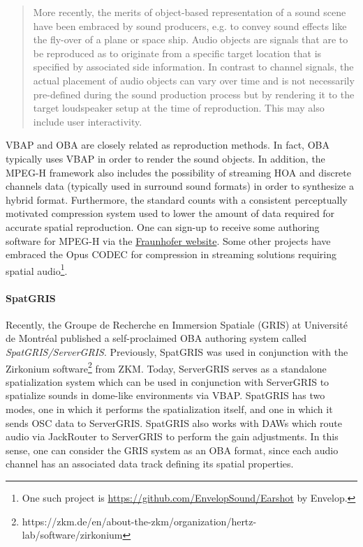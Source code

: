 \begin{quote}
    More recently, the merits of object-based representation of a sound scene have been embraced by sound producers, e.g. to convey sound effects like the fly-over of a plane or space ship. Audio objects are signals that are to be reproduced as to originate from a specific target location that is specified by associated side information. In contrast to channel signals, the actual placement of audio objects can vary over time and is not necessarily pre-defined during the sound production process but by rendering it to the target loudspeaker setup at the time of reproduction. This may also include user interactivity.
\end{quote}

VBAP and OBA are closely related as reproduction methods. In fact, OBA typically uses VBAP in order to render the sound objects. In addition, the MPEG-H framework also includes the possibility of streaming HOA and discrete channels data (typically used in surround sound formats) in order to synthesize a hybrid format. Furthermore, the standard counts with a consistent perceptually motivated compression system used to lower the amount of data required for accurate spatial reproduction. One can sign-up to receive some authoring software for MPEG-H via the  \href{https://www.iis.fraunhofer.de/en/ff/amm/dl/software/mas.html}{Fraunhofer website}. Some other projects have embraced the Opus CODEC for compression in streaming solutions requiring spatial audio\footnote{One such project is \href{Earshot}{https://github.com/EnvelopSound/Earshot} by Envelop.}.

\paragraph{SpatGRIS}

Recently, the Groupe de Recherche en Immersion Spatiale (GRIS) at Université de Montréal published a self-proclaimed OBA authoring system called \textit{SpatGRIS/ServerGRIS}. Previously, SpatGRIS was used in conjunction with the Zirkonium software\footnote{https://zkm.de/en/about-the-zkm/organization/hertz-lab/software/zirkonium} from ZKM. Today, ServerGRIS serves as a standalone spatialization system which can be used in conjunction with ServerGRIS to spatialize sounds in dome-like environments via VBAP. SpatGRIS has two modes, one in which it performs the spatialization itself, and one in which it sends OSC data to ServerGRIS. SpatGRIS also works with DAWs which route audio via JackRouter to ServerGRIS to perform the gain adjustments. In this sense, one can consider the GRIS system as an OBA format, since each audio channel has an associated data track defining its spatial properties.

